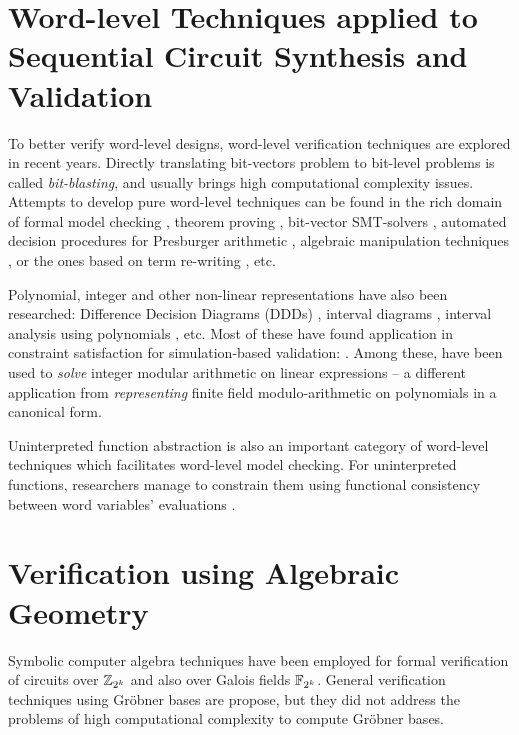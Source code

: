 \section{Word-level Techniques applied to Sequential Circuit Synthesis and Validation}
To better verify word-level designs, word-level verification techniques are 
explored in recent years. Directly translating bit-vectors problem to bit-level 
problems is called {\it bit-blasting}, and usually brings high computational complexity issues.
Attempts to develop pure word-level techniques can be found in
the rich domain of formal model checking \cite{BHEL96} \cite{SMV},
theorem proving \cite{arditi:bmd}, bit-vector SMT-solvers
\cite{boolector} \cite{cvc3} \cite{z3} \cite{bitvector98}, automated
decision procedures for Presburger arithmetic \cite{presburger}
\cite{bultan:mixed_verification}, algebraic manipulation techniques 
\cite{devadas:algebraic_manipulation_iccd91}, or the ones based on
term re-writing \cite{AST}, etc. %

Polynomial, integer and other non-linear representations have also
been researched: Difference Decision Diagrams (DDDs) \cite{ddd-csl99} \cite{ddd-mt-98}, interval
diagrams \cite{interval_dd}, interval analysis using polynomials
\cite{polynomial_sanchez99}, etc. Most of these have found 
application in constraint satisfaction for simulation-based
validation:  \cite{Ritter99} \cite{hsat} \cite{lpsat}
\cite{brinkmann:asp-dac} \cite{Huang:tcad01} \cite{bitvector98}. Among
these, \cite{brinkmann:asp-dac} \cite{Huang:tcad01} \cite{bitvector98}
have been used to {\it solve} integer modular arithmetic on linear
expressions -- a different application from {\it representing}
finite field modulo-arithmetic on polynomials in a canonical form.   

Uninterpreted function abstraction is also an important category of 
word-level techniques which facilitates word-level model checking.
For uninterpreted functions, researchers manage to constrain them 
using functional consistency between word variables' evaluations
\cite{UF1,UF2,UF3}.


\section{Verification using Algebraic Geometry}

Symbolic computer algebra techniques have been employed for formal
verification of circuits over ${\mathbb{Z}}_{2^k}$ and also over
Galois fields ${\mathbb{F}}_{2^k}$. 
General verification techniques using Gr\"obner bases
\cite{Avrunin:CAV} \cite{gbverify:2007} \cite{manna:program} are propose,
but they did not address the problems of high computational complexity to
compute Gr\"obner bases.

